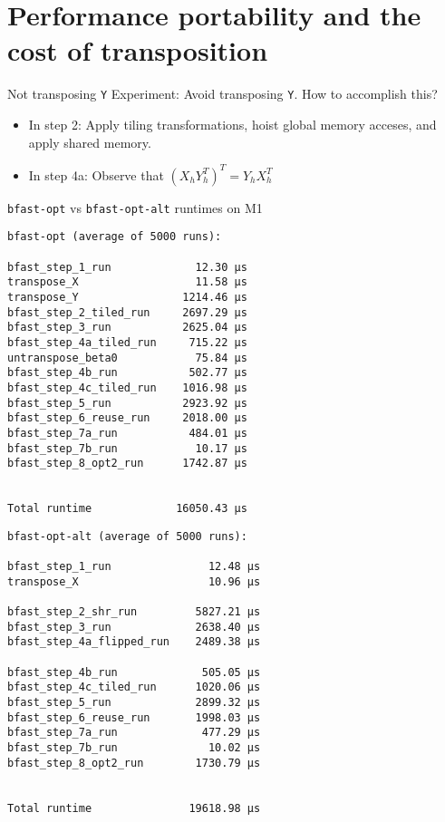 \section{Performance portability and the cost of transposition}

\begin{frame}[fragile]{Not transposing \texttt{Y}}
Experiment: Avoid transposing \texttt{Y}.
How to accomplish this?
\begin{itemize}
  \item In step 2: Apply tiling transformations, hoist global memory acceses,
    and apply shared memory.
  \item In step 4a: Observe that \( (X_hY_h^T)^T = Y_hX_h^T \)
\end{itemize}
\end{frame}

\begin{frame}[fragile]{\texttt{bfast-opt} vs \texttt{bfast-opt-alt} runtimes on M1}
\begin{minipage}{.55\textwidth}
\centering
\begin{verbatim}
bfast-opt (average of 5000 runs):

bfast_step_1_run             12.30 µs
transpose_X                  11.58 µs
transpose_Y                1214.46 µs
bfast_step_2_tiled_run     2697.29 µs
bfast_step_3_run           2625.04 µs
bfast_step_4a_tiled_run     715.22 µs
untranspose_beta0            75.84 µs
bfast_step_4b_run           502.77 µs
bfast_step_4c_tiled_run    1016.98 µs
bfast_step_5_run           2923.92 µs
bfast_step_6_reuse_run     2018.00 µs
bfast_step_7a_run           484.01 µs
bfast_step_7b_run            10.17 µs
bfast_step_8_opt2_run      1742.87 µs


Total runtime             16050.43 µs
\end{verbatim}
\end{minipage}%
\begin{minipage}{.5\textwidth}
\centering
\begin{verbatim}
bfast-opt-alt (average of 5000 runs):

bfast_step_1_run               12.48 µs
transpose_X                    10.96 µs

bfast_step_2_shr_run         5827.21 µs
bfast_step_3_run             2638.40 µs
bfast_step_4a_flipped_run    2489.38 µs

bfast_step_4b_run             505.05 µs
bfast_step_4c_tiled_run      1020.06 µs
bfast_step_5_run             2899.32 µs
bfast_step_6_reuse_run       1998.03 µs
bfast_step_7a_run             477.29 µs
bfast_step_7b_run              10.02 µs
bfast_step_8_opt2_run        1730.79 µs


Total runtime               19618.98 µs
\end{verbatim}
\end{minipage}
\end{frame}

